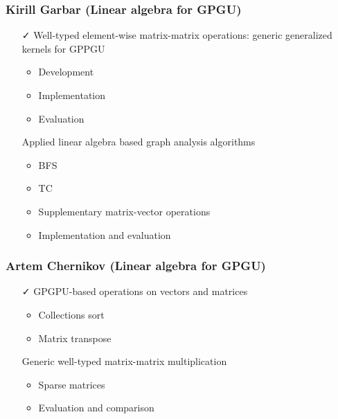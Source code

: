 \documentclass[xcolor=table,aspectratio=169]{beamer}
\begin{document}
\begin{frame}[fragile]
  \frametitle{Kirill Garbar (Linear algebra for GPGU)}
  \begin{minipage}[t]{0.48\textwidth}
    \begin{itemize}
      \item[\faCheck] Well-typed element-wise matrix-matrix operations: generic generalized kernels for GPPGU 
      \begin{itemize}
        \item Development
        \item Implementation
        \item Evaluation        
      \end{itemize}      
    \end{itemize}
  \end{minipage}
  \pause
  \begin{minipage}[t]{0.48\textwidth}
    \begin{itemize}
      \item[\faHourglassHalf] Applied linear algebra based graph analysis algorithms
      \begin{itemize}
        \item BFS
        \item TC
        \item Supplementary matrix-vector operations
        \item Implementation and evaluation
      \end{itemize}      
    \end{itemize}
  \end{minipage}
\end{frame}

\begin{frame}[fragile]
  \frametitle{Artem Chernikov (Linear algebra for GPGU)}
  \begin{minipage}[t]{0.48\textwidth}
    \begin{itemize}
      \item[\faCheck] GPGPU-based operations on vectors and matrices
      \begin{itemize}
        \item Collections sort
        \item Matrix transpose
      \end{itemize} 
    \end{itemize}
  \end{minipage}
  \pause
  \begin{minipage}[t]{0.48\textwidth}
    \begin{itemize}
      \item[\faHourglassHalf] Generic well-typed matrix-matrix multiplication
      \begin{itemize}
        \item Sparse matrices
        \item Evaluation and comparison
      \end{itemize} 
    \end{itemize}
  \end{minipage}
\end{frame}
\end{document}
